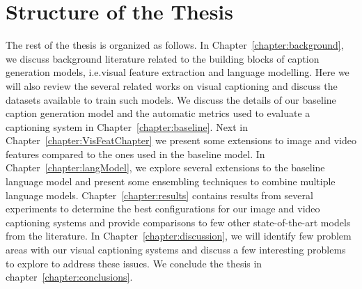\section{Structure of the Thesis}
\label{section:structure} 
The rest of the thesis is organized as follows.
In Chapter~\ref{chapter:background}, we discuss background literature related
to the building blocks of caption generation models, i.e.\@ visual feature
extraction and language modelling. 
Here we will also review the several related works on visual captioning
and discuss the datasets available to train such models.
We discuss the details of our baseline caption generation model and the
automatic metrics used to evaluate a captioning system in Chapter~\ref{chapter:baseline}. 
Next in Chapter~\ref{chapter:VisFeatChapter} we present some extensions to
image and video features compared to the ones used in the baseline model.
In Chapter~\ref{chapter:langModel}, we explore several extensions to the
baseline language model and present some ensembling techniques to combine
multiple language models.
Chapter~\ref{chapter:results} contains results from several experiments to
determine the best configurations for our image and video captioning systems and
provide comparisons to few other state-of-the-art models from the literature.
In Chapter~\ref{chapter:discussion}, we will identify few problem areas with our
visual captioning systems and discuss a few interesting problems to explore to
address these issues.
We conclude the thesis in chapter~\ref{chapter:conclusions}.
